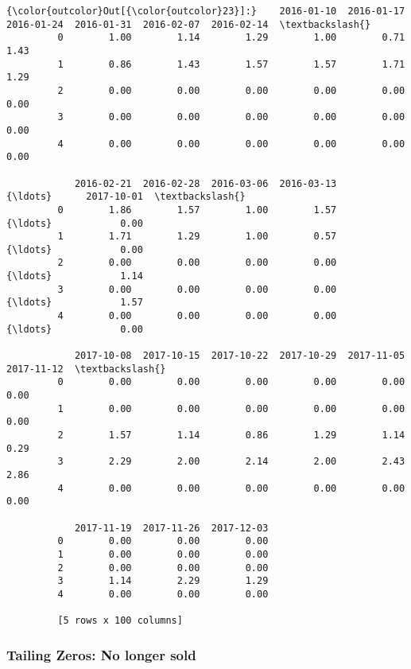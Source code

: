 \documentclass[11pt]{article}
\begin{document}
\begin{Verbatim}[commandchars=\\\{\}]
{\color{outcolor}Out[{\color{outcolor}23}]:}    2016-01-10  2016-01-17  2016-01-24  2016-01-31  2016-02-07  2016-02-14  \textbackslash{}
         0        1.00        1.14        1.29        1.00        0.71        1.43   
         1        0.86        1.43        1.57        1.57        1.71        1.29   
         2        0.00        0.00        0.00        0.00        0.00        0.00   
         3        0.00        0.00        0.00        0.00        0.00        0.00   
         4        0.00        0.00        0.00        0.00        0.00        0.00   
         
            2016-02-21  2016-02-28  2016-03-06  2016-03-13     {\ldots}      2017-10-01  \textbackslash{}
         0        1.86        1.57        1.00        1.57     {\ldots}            0.00   
         1        1.71        1.29        1.00        0.57     {\ldots}            0.00   
         2        0.00        0.00        0.00        0.00     {\ldots}            1.14   
         3        0.00        0.00        0.00        0.00     {\ldots}            1.57   
         4        0.00        0.00        0.00        0.00     {\ldots}            0.00   
         
            2017-10-08  2017-10-15  2017-10-22  2017-10-29  2017-11-05  2017-11-12  \textbackslash{}
         0        0.00        0.00        0.00        0.00        0.00        0.00   
         1        0.00        0.00        0.00        0.00        0.00        0.00   
         2        1.57        1.14        0.86        1.29        1.14        0.29   
         3        2.29        2.00        2.14        2.00        2.43        2.86   
         4        0.00        0.00        0.00        0.00        0.00        0.00   
         
            2017-11-19  2017-11-26  2017-12-03  
         0        0.00        0.00        0.00  
         1        0.00        0.00        0.00  
         2        0.00        0.00        0.00  
         3        1.14        2.29        1.29  
         4        0.00        0.00        0.00  
         
         [5 rows x 100 columns]
\end{Verbatim}
            
    \subsubsection{Tailing Zeros: No longer
sold}\label{tailing-zeros-no-longer-sold}
\end{document}
